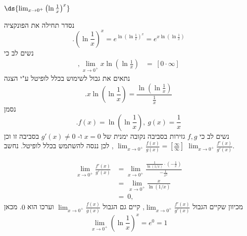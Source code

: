 \item $\ds{\lim_{x \to 0^+} \left( \ln \frac{1}{x} \right)^x}$
\begin{solbox}
נסדר תחילה את הפונקציה
$$.\left(\ln\frac{1}{x}\right)^x=e^{\ln\left(\ln\frac{1}{x}\right)^x}=e^{x\ln\left(\ln\frac{1}{x}\right)}$$
נשים לב כי
\begin{align*}
,\lim_{x\to 0^+}x\ln\left( \ln \frac{1}{x} \right)
&=\ [0\cdot\infty]
\end{align*}
נתאים את גבול לשימוש בכלל לופיטל ע"י הצגה
$$.x\ln\left( \ln \frac{1}{x} \right)=\frac{\ln\left( \ln \frac{1}{x} \right)}{\frac{1}{x}}$$
נסמן
$$.f(x)=\ln\left( \ln \frac{1}{x} \right),\ g(x)=\frac{1}{x}$$
נשים לב כי
$f,g$
גזירות בסביבה נקובה ימנית של
$x=0$
ו-
$g'(x)\neq0$
בסביבה זו וכן
$\displaystyle\lim_{x\to0^+}\frac{f(x)}{g(x)}=\left[\frac{\infty}{\infty}\right]$
, לכן ננסה להשתמש בכלל לופיטל.
נחשב
$\lim_{x\to 0^+}\frac{f'(x)}{g'(x)}$.

\begin{align*}
\lim_{x\to 0^+}\frac{f'(x)}{g'(x)}&= \lim_{x\to 0^+}\frac{\frac{1}{\ln(1/x)}\cdot\left(-\frac{1}{x}\right)}{-\frac{1}{x^2}}\\[6pt]
&=\ \lim_{x\to 0^+}\frac{x}{\ln(1/x)}\\
&=\ 0,
\end{align*}
מכיוון שקיים הגבול
$\displaystyle\lim_{x\to 0^+}\frac{f'(x)}{g'(x)}$,
קיים גם הגבול
$\displaystyle\lim_{x\to 0^+}\frac{f(x)}{g(x)}$
וערכו הוא
$0$.
מכאן
$$\lim_{x \to 0^+} \left( \ln \frac{1}{x} \right)^x=e^0=1$$
\end{solbox}
\eMs
\eE
